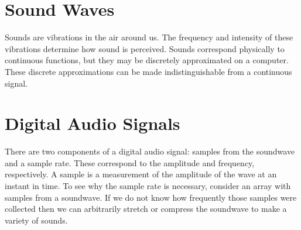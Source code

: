 

\section*{Sound Waves}

Sounds are vibrations in the air around us.
The frequency and intensity of these vibrations determine how sound is perceived.
Sounds correspond physically to continuous functions, but they may be discretely approximated on a computer.
These discrete approximations can be made indistinguishable from a continuous signal.

\section*{Digital Audio Signals}

There are two components of a digital audio signal: samples from the soundwave and a sample rate.
These correspond to the amplitude and frequency, respectively.
A sample is a measurement of the amplitude of the wave at an instant in time.
To see why the sample rate is necessary, consider an array with samples from a soundwave.
If we do not know how frequently those samples were collected then we can arbitrarily stretch or compress the soundwave to make a variety of sounds.

